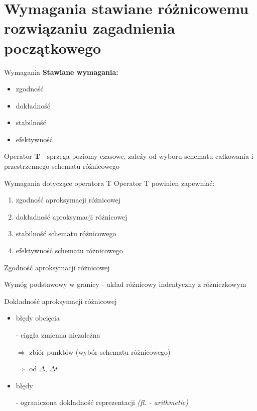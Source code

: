 \section{Wymagania stawiane różnicowemu rozwiązaniu zagadnienia początkowego}
\begin{frame}{Wymagania}
\textbf{Stawiane wymagania:}
	\begin{itemize}
      \item zgodność
      \item dokładność
      \item stabilność
      \item efektywność
	\end{itemize}
    
	\begin{flushleft}
	Operator \textbf{T} - sprzęga poziomy czasowe, zależy od wyboru schematu 	całkowania i przestrzennego schematu różnicowego 
	\end{flushleft}
\end{frame}
\begin{frame}{Wymagania dotyczące operatora T}
  Operator T powinien zapewniać:
  \begin{enumerate}
    \item zgodność aproksymacji różnicowej 
    \item dokładność aproksymacji różnicowej
    \item stabilność schematu różnicowego
    \item efektywność schematu różnicowego
  \end{enumerate}
\end{frame}
\begin{frame}{Zgodność aproksymacji różnicowej}
  \begin{block}{Wymóg podstawowy}
  	w granicy - układ różnicowy indentyczny z różniczkowym
  \end{block}
\end{frame}
\begin{frame}{Dokładność aproksymacji różnicowej}
  \begin{itemize}
    \item błędy obcięcia\par 
    - ciągła zmienna niezależna \par
    \quad $\Rightarrow$ zbiór punktów (wybór schematu różnicowego) \par
    \quad $\Rightarrow$  od $\Delta$, $\Delta t$
    \item błędy \par
    \quad - ograniczona dokładność reprezentacji \textit{(fl. - arithmetic)}
  \end{itemize}
\end{frame}
